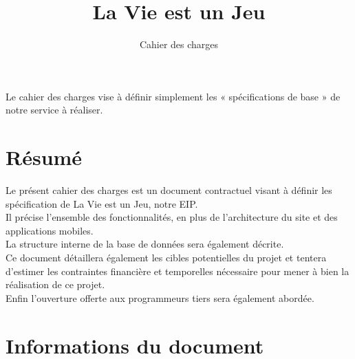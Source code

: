 \documentclass{life-fr}
\begin{document}
\title{La Vie est un Jeu}
\subtitle{Cahier des charges}

\summary
{
  Le cahier des charges vise à définir simplement les « spécifications de base » de notre service à réaliser.
}

\maketitle

\chapter*{Résumé}
{
  Le présent cahier des charges est un document contractuel visant à définir les spécification de La Vie est un Jeu, notre EIP.\\
  Il précise l'ensemble des fonctionnalités, en plus de l'architecture du site et des applications mobiles.\\
  La structure interne de la base de données sera également décrite.\\
  Ce document détaillera également les cibles potentielles du projet et tentera d'estimer les contraintes financière et temporelles nécessaire pour mener à bien la réalisation de ce projet.\\
  Enfin l'ouverture offerte aux programmeurs tiers sera également abordée.\\
}

\chapter*{Informations du document}
\end{document}
